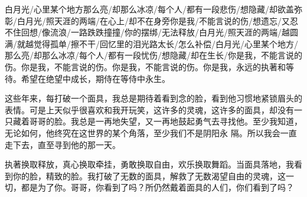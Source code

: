 \documentclass{article}
\begin{document}
白月光/心里某个地方那么亮/却那么冰凉/每个人/都有一段悲伤/想隐藏/却欲盖弥彰/白月光/照天涯的两端/在心上/却不在身旁你是我/不能言说的伤/想遗忘/又忍不住回想/像流浪/一路跌跌撞撞/你的摆绑/无法释放/白月光/照天涯的两端/越圆满/就越觉得孤单/擦不干/回忆里的泪光路太长/怎么补偿/白月光/心里某个地方/那么亮/却那么冰凉/每个人/都有一段忧伤/想隐藏/却在生长/你是我，不能言说的伤。你是我，不能言说的伤。你是我，不能言说的伤。你是我，永远的执著和等待。希望在绝望中成长，期侍在等侍中永生。
\newpage


这些年来，每打破一个面具，我总是期待着看到念的脸，看到他习惯地紧锁眉头的表情。可是上天似乎很喜欢和我开玩笑，这许多的灵魂，这许多的面具，却没有一只藏着哥哥的脸。我总是一再地失望，又一再地鼓起勇气去寻找他。至少我知道，无论如何，他终究在这世界的某个角落，至少我们不是阴阳永
隔。所以我会一直走下去，直至寻到他的那一天。 

执著换取释放，真心换取牵挂，勇敢换取自由，欢乐换取舞蹈。当面具落地，我看到你的脸，精致的脸。我打破了无数的面具，解救了无数渴望自由的灵魂，这一切，都是为了你。哥哥，你看到了吗？所仍然戴着面具的人们，你们看到了吗？
\end{document}
